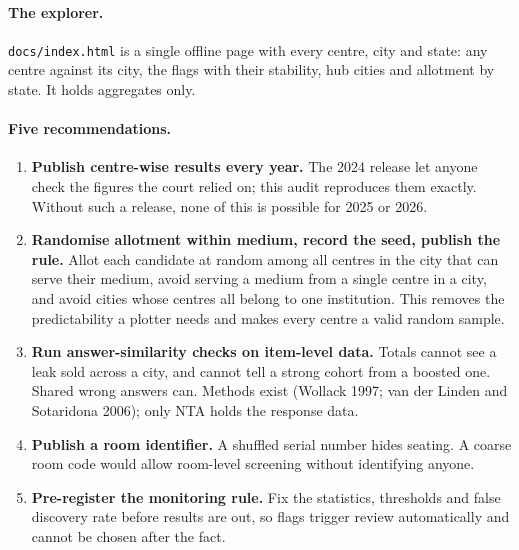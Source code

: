 \documentclass[11pt]{article}
\begin{document}
\paragraph{The explorer.} \texttt{docs/index.html} is a single offline page with every centre, city and state: any centre against its city, the flags with their stability, hub cities and allotment by state. It holds aggregates only.

\paragraph{Five recommendations.}
\begin{enumerate}[leftmargin=1.5em]
\item \textbf{Publish centre-wise results every year.} The 2024 release let anyone check the figures the court relied on; this audit reproduces them exactly. Without such a release, none of this is possible for 2025 or 2026.
\item \textbf{Randomise allotment within medium, record the seed, publish the rule.} Allot each candidate at random among all centres in the city that can serve their medium, avoid serving a medium from a single centre in a city, and avoid cities whose centres all belong to one institution. This removes the predictability a plotter needs and makes every centre a valid random sample.
\item \textbf{Run answer-similarity checks on item-level data.} Totals cannot see a leak sold across a city, and cannot tell a strong cohort from a boosted one. Shared wrong answers can. Methods exist (Wollack 1997; van der Linden and Sotaridona 2006); only NTA holds the response data.
\item \textbf{Publish a room identifier.} A shuffled serial number hides seating. A coarse room code would allow room-level screening without identifying anyone.
\item \textbf{Pre-register the monitoring rule.} Fix the statistics, thresholds and false discovery rate before results are out, so flags trigger review automatically and cannot be chosen after the fact.
\end{enumerate}
\end{document}
